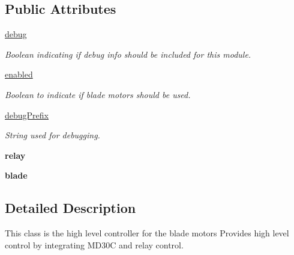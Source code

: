 \subsection*{Public Attributes}
\begin{DoxyCompactItemize}
\item 
\mbox{\label{classmcs_1_1BladeControl_1_1BladeControl_a6ebee023da9ad1fda94b73fee606f9d4}} 
\hyperlink{classmcs_1_1BladeControl_1_1BladeControl_a6ebee023da9ad1fda94b73fee606f9d4}{debug}
\begin{DoxyCompactList}\small\item\em Boolean indicating if debug info should be included for this module. \end{DoxyCompactList}\item 
\hyperlink{classmcs_1_1BladeControl_1_1BladeControl_a6b4ee49331139f85b85153f54d9bc164}{enabled}
\begin{DoxyCompactList}\small\item\em Boolean to indicate if blade motors should be used. \end{DoxyCompactList}\item 
\mbox{\label{classmcs_1_1BladeControl_1_1BladeControl_a49c3b63398c7fd7744eadb1205ee81bf}} 
\hyperlink{classmcs_1_1BladeControl_1_1BladeControl_a49c3b63398c7fd7744eadb1205ee81bf}{debug\+Prefix}
\begin{DoxyCompactList}\small\item\em String used for debugging. \end{DoxyCompactList}\item 
\mbox{\label{classmcs_1_1BladeControl_1_1BladeControl_a76a90ce485b59963ee9f10df0c80f136}} 
{\bfseries relay}
\item 
\mbox{\label{classmcs_1_1BladeControl_1_1BladeControl_ac032c4499f46d53b825462847570f4d4}} 
{\bfseries blade}
\end{DoxyCompactItemize}


\subsection{Detailed Description}
This class is the high level controller for the blade motors Provides high level control by integrating M\+D30C and relay control. 

